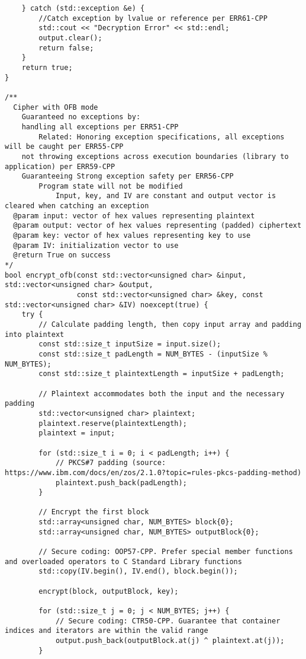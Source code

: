 \documentclass[a4paper,12pt]{article}
\begin{document}
{\begin{lstlisting}
    } catch (std::exception &e) {
        //Catch exception by lvalue or reference per ERR61-CPP
        std::cout << "Decryption Error" << std::endl;
        output.clear();
        return false;
    }
    return true;
}

/**
  Cipher with OFB mode
    Guaranteed no exceptions by:
    handling all exceptions per ERR51-CPP
        Related: Honoring exception specifications, all exceptions will be caught per ERR55-CPP
    not throwing exceptions across execution boundaries (library to application) per ERR59-CPP
    Guaranteeing Strong exception safety per ERR56-CPP
        Program state will not be modified
            Input, key, and IV are constant and output vector is cleared when catching an exception
  @param input: vector of hex values representing plaintext
  @param output: vector of hex values representing (padded) ciphertext
  @param key: vector of hex values representing key to use
  @param IV: initialization vector to use
  @return True on success
*/
bool encrypt_ofb(const std::vector<unsigned char> &input, std::vector<unsigned char> &output,
                 const std::vector<unsigned char> &key, const std::vector<unsigned char> &IV) noexcept(true) {
    try {
        // Calculate padding length, then copy input array and padding into plaintext
        const std::size_t inputSize = input.size();
        const std::size_t padLength = NUM_BYTES - (inputSize % NUM_BYTES);
        const std::size_t plaintextLength = inputSize + padLength;

        // Plaintext accommodates both the input and the necessary padding
        std::vector<unsigned char> plaintext;
        plaintext.reserve(plaintextLength);
        plaintext = input;

        for (std::size_t i = 0; i < padLength; i++) {
            // PKCS#7 padding (source: https://www.ibm.com/docs/en/zos/2.1.0?topic=rules-pkcs-padding-method)
            plaintext.push_back(padLength);
        }

        // Encrypt the first block
        std::array<unsigned char, NUM_BYTES> block{0};
        std::array<unsigned char, NUM_BYTES> outputBlock{0};

        // Secure coding: OOP57-CPP. Prefer special member functions and overloaded operators to C Standard Library functions
        std::copy(IV.begin(), IV.end(), block.begin());

        encrypt(block, outputBlock, key);

        for (std::size_t j = 0; j < NUM_BYTES; j++) {
            // Secure coding: CTR50-CPP. Guarantee that container indices and iterators are within the valid range
            output.push_back(outputBlock.at(j) ^ plaintext.at(j));
        }


\end{lstlisting}}
\end{document}
